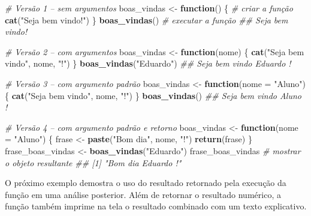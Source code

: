 \documentclass[
  11pt,
  a5paper,
  openany]{book}
\newenvironment{Shaded}{\begin{snugshade}}{\end{snugshade}}
\newcommand{\CommentTok}[1]{\textcolor[rgb]{0.56,0.35,0.01}{\textit{#1}}}
\newcommand{\ControlFlowTok}[1]{\textcolor[rgb]{0.13,0.29,0.53}{\textbf{#1}}}
\newcommand{\DataTypeTok}[1]{\textcolor[rgb]{0.13,0.29,0.53}{#1}}
\newcommand{\KeywordTok}[1]{\textcolor[rgb]{0.13,0.29,0.53}{\textbf{#1}}}
\newcommand{\NormalTok}[1]{#1}
\newcommand{\StringTok}[1]{\textcolor[rgb]{0.31,0.60,0.02}{#1}}
\begin{document}
\begin{Shaded}
\begin{Highlighting}[]
\CommentTok{# Versão 1 – sem argumentos}
\NormalTok{boas_vindas <-}\StringTok{ }\ControlFlowTok{function}\NormalTok{() \{ }\CommentTok{# criar a função}
    \KeywordTok{cat}\NormalTok{(}\StringTok{"Seja bem vindo!"}\NormalTok{)}
\NormalTok{\}}
\KeywordTok{boas_vindas}\NormalTok{() }\CommentTok{# executar a função}
\CommentTok{## Seja bem vindo!}

\CommentTok{# Versão 2 – com argumentos}
\NormalTok{boas_vindas <-}\StringTok{ }\ControlFlowTok{function}\NormalTok{(nome) \{}
    \KeywordTok{cat}\NormalTok{(}\StringTok{"Seja bem vindo"}\NormalTok{, nome, }\StringTok{"!"}\NormalTok{)}
\NormalTok{\}}
\KeywordTok{boas_vindas}\NormalTok{(}\StringTok{"Eduardo"}\NormalTok{)}
\CommentTok{## Seja bem vindo Eduardo !}

\CommentTok{# Versão 3 – com argumento padrão}
\NormalTok{boas_vindas <-}\StringTok{ }\ControlFlowTok{function}\NormalTok{(}\DataTypeTok{nome =} \StringTok{"Aluno"}\NormalTok{) \{}
    \KeywordTok{cat}\NormalTok{(}\StringTok{"Seja bem vindo"}\NormalTok{, nome, }\StringTok{"!"}\NormalTok{)}
\NormalTok{\}}
\KeywordTok{boas_vindas}\NormalTok{()}
\CommentTok{## Seja bem vindo Aluno !}

\CommentTok{# Versão 4 – com argumento padrão e retorno}
\NormalTok{boas_vindas <-}\StringTok{ }\ControlFlowTok{function}\NormalTok{(}\DataTypeTok{nome =} \StringTok{"Aluno"}\NormalTok{) \{}
\NormalTok{    frase <-}\StringTok{ }\KeywordTok{paste}\NormalTok{(}\StringTok{"Bom dia"}\NormalTok{, nome, }\StringTok{"!"}\NormalTok{)}
    \KeywordTok{return}\NormalTok{(frase)}
\NormalTok{\}}
\NormalTok{frase_boas_vindas <-}\StringTok{ }\KeywordTok{boas_vindas}\NormalTok{(}\StringTok{"Eduardo"}\NormalTok{)}
\NormalTok{frase_boas_vindas }\CommentTok{# mostrar o objeto resultante}
\CommentTok{## [1] "Bom dia Eduardo !"}
\end{Highlighting}
\end{Shaded}

O próximo exemplo demostra o uso do resultado retornado pela execução da função em uma análise posterior. Além de retornar o resultado numérico, a função também imprime na tela o resultado combinado com um texto explicativo.
\end{document}
